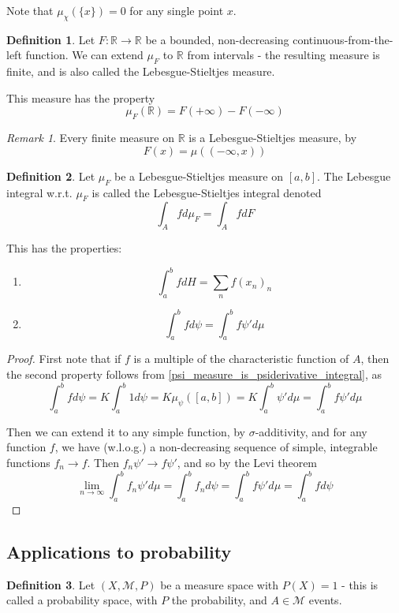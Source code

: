 \documentclass[11pt,a4paper]{report}
\theoremstyle{plain}
\theoremstyle{definition}
\newtheorem*{defn}{Definition}
\theoremstyle{remark}
\newtheorem*{rem}{Remark}
\newcommand{\R}{\mathbb{R}}
\newcommand{\cM}{\mathcal{M}}
\begin{document}
Note that $\mu_\chi(\{x\}) = 0$ for any single point $x$.

\begin{defn}
  Let $F : \R \to \R$ be a bounded, non-decreasing continuous-from-the-left function. We can extend $\mu_F$ to $\R$ from intervals - the resulting measure is finite, and is also called the Lebesgue-Stieltjes measure.
  
  This measure has the property
  $$ \mu_F(\R) = F(+\infty) - F(-\infty) $$
\end{defn}

\begin{rem}
  Every finite measure on $\R$ is a Lebesgue-Stieltjes measure, by
  $$ F(x) = \mu((-\infty, x)) $$
\end{rem}

\begin{defn}
  Let $\mu_F$ be a Lebesgue-Stieltjes measure on $[a, b]$. The Lebesgue integral w.r.t. $\mu_F$ is called the Lebesgue-Stieltjes integral denoted
  $$ \int_A f d\mu_F = \int_A f dF $$
\end{defn}

This has the properties:
\begin{enumerate}
    \item $$ \int_a^b f dH = \sum_n f(x_n)_n $$
    \item $$ \int_a^b f d\psi = \int_a^b f\psi' d\mu $$
\end{enumerate}

\begin{proof}
  First note that if $f$ is a multiple of the characteristic function of $A$, then the second property follows from \ref{psi_measure_is_psiderivative_integral}, as
  $$ \int_a^b f d\psi = K \int_a^b 1 d\psi = K\mu_\psi([a, b]) = K\int_a^b \psi'd\mu = \int_a^b f\psi' d\mu $$
  
  Then we can extend it to any simple function, by $\sigma$-additivity, and for any function $f$, we have (w.l.o.g.) a non-decreasing sequence of simple, integrable functions $f_n \to f$. Then $f_n\psi' \to f\psi'$, and so by the Levi theorem
  $$ \lim_{n \to \infty} \int_a^b f_n\psi' d\mu = \int_a^b f_n d\psi = \int_a^b f\psi' d\mu = \int_a^b f d\psi $$
\end{proof}

\subsection{Applications to probability}

\begin{defn}
Let $(X, \cM, P)$ be a measure space with $P(X) = 1$ - this is called a probability space, with $P$ the probability, and $A \in \cM$ events.
\end{defn}
\end{document}
